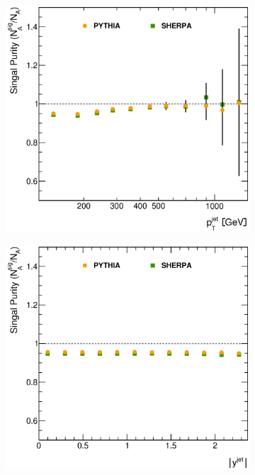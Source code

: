 \documentclass[12pt, twoside]{article}
\numberwithin{equation}{section}
\numberwithin{figure}{section}
\newenvironment{changemargin}[2]{%
\begin{list}{}{%
\setlength{\topsep}{0pt}%
\setlength{\leftmargin}{#1}%
\setlength{\rightmargin}{#2}%
\setlength{\listparindent}{\parindent}%
\setlength{\itemindent}{\parindent}%
\setlength{\parsep}{\parskip}%
}%
\item[]}{\end{list}}
\begin{document}
\begin{figure}
\begin{changemargin}{-1.0cm}{-0.75cm}
\begin{changemargin}{-0.75cm}{-1.0cm}
        \vspace{0.2cm}
        \begin{subfigure}[b]{0.37\textwidth}
            \includegraphics[width=\textwidth]{./images/SignalPurity/SIG_PUR-104.eps}
            \subcaption{}
            \label{fig:PurityPtJet}
        \end{subfigure}
        \begin{subfigure}[b]{0.37\textwidth}
            \includegraphics[width=\textwidth]{./images/SignalPurity/SIG_PUR-105.eps}

\end{subfigure}
\end{changemargin}
\end{changemargin}
\end{figure}
\end{document}
